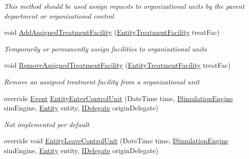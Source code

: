 \begin{DoxyCompactItemize}
\begin{DoxyCompactList}\small\item\em This method should be used assign requests to organizational units by the parent department or organizational control \end{DoxyCompactList}\item 
void \hyperlink{class_general_health_care_elements_1_1_control_units_1_1_control_unit_organizational_unit_a90f401c73e3e9a4c4e7f0acf7d70145f}{Add\+Assigned\+Treatment\+Facility} (\hyperlink{class_general_health_care_elements_1_1_entities_1_1_entity_treatment_facility}{Entity\+Treatment\+Facility} treat\+Fac)
\begin{DoxyCompactList}\small\item\em Temporarily or permanently assign facilities to organizational units \end{DoxyCompactList}\item 
void \hyperlink{class_general_health_care_elements_1_1_control_units_1_1_control_unit_organizational_unit_ac23f25cb1d70d56683d6fb146c1e24b5}{Remove\+Assigned\+Treatment\+Facility} (\hyperlink{class_general_health_care_elements_1_1_entities_1_1_entity_treatment_facility}{Entity\+Treatment\+Facility} treat\+Fac)
\begin{DoxyCompactList}\small\item\em Remove an assigned treatment facility from a organizational unit \end{DoxyCompactList}\item 
override \hyperlink{class_simulation_core_1_1_h_c_c_m_elements_1_1_event}{Event} \hyperlink{class_general_health_care_elements_1_1_control_units_1_1_control_unit_organizational_unit_a4affae204b908fe0561b3f94d2817e75}{Entity\+Enter\+Control\+Unit} (Date\+Time time, \hyperlink{interface_simulation_core_1_1_simulation_classes_1_1_i_simulation_engine}{I\+Simulation\+Engine} sim\+Engine, \hyperlink{class_simulation_core_1_1_h_c_c_m_elements_1_1_entity}{Entity} entity, \hyperlink{interface_simulation_core_1_1_h_c_c_m_elements_1_1_i_delegate}{I\+Delegate} origin\+Delegate)
\begin{DoxyCompactList}\small\item\em Not implemented per default \end{DoxyCompactList}\item 
override void \hyperlink{class_general_health_care_elements_1_1_control_units_1_1_control_unit_organizational_unit_ab683e439b0717e218dfe538fad642715}{Entity\+Leave\+Control\+Unit} (Date\+Time time, \hyperlink{interface_simulation_core_1_1_simulation_classes_1_1_i_simulation_engine}{I\+Simulation\+Engine} sim\+Engine, \hyperlink{class_simulation_core_1_1_h_c_c_m_elements_1_1_entity}{Entity} entity, \hyperlink{interface_simulation_core_1_1_h_c_c_m_elements_1_1_i_delegate}{I\+Delegate} origin\+Delegate)

\end{DoxyCompactItemize}
